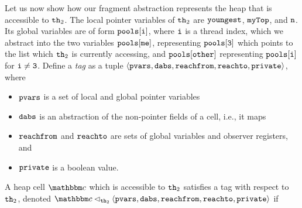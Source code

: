 Let us now show how our fragment abstraction represents the heap that is
accessible to ${\tt th}_2$.
The local pointer variables of ${\tt th}_2$ are 
${\tt youngest}$, ${\tt myTop}$, and ${\tt n}$. Its global variables are of form
${\tt pools[i]}$, where ${\tt i}$ is a thread index, which we abstract into the
two variables ${\tt pools[me]}$, representing ${\tt pools[3]}$
which points to the list which ${\tt th}_2$ is currently accessing,
and ${\tt pools[other]}$ representing ${\tt pools[i]}$ for $\tt i \neq 3$.
Define a {\em tag} as a tuple
$\left\langle\mathtt{pvars},\mathtt{dabs},\mathtt{reachfrom},\mathtt{reachto},\mathtt{private}\right\rangle$, where
\begin{itemize}
\item
  $\mathtt{pvars}$ is a set of local and global pointer variables
\item
  $\mathtt{dabs}$ is an abstraction of the non-pointer fields of a cell,
  i.e., it maps
\item
  $\mathtt{reachfrom}$ and $\mathtt{reachto}$ are sets of global variables and observer registers, and %
\item
  $\mathtt{private}$ is a boolean value.
\end{itemize}
A heap cell $\cell$ which is accessible to ${\tt th}_2$ satisfies a tag
with respect to ${\tt th}_2$,
denoted $\cell \satfrag{{\thread_2}} \tagtuple$ if
